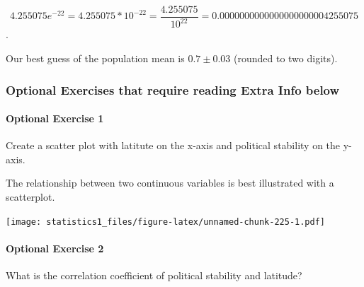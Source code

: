 \documentclass[]{article}
\newenvironment{Shaded}{\begin{snugshade}}{\end{snugshade}}
\newcommand{\KeywordTok}[1]{\textcolor[rgb]{0.13,0.29,0.53}{\textbf{#1}}}
\newcommand{\DataTypeTok}[1]{\textcolor[rgb]{0.13,0.29,0.53}{#1}}
\newcommand{\DecValTok}[1]{\textcolor[rgb]{0.00,0.00,0.81}{#1}}
\newcommand{\FloatTok}[1]{\textcolor[rgb]{0.00,0.00,0.81}{#1}}
\newcommand{\StringTok}[1]{\textcolor[rgb]{0.31,0.60,0.02}{#1}}
\newcommand{\OperatorTok}[1]{\textcolor[rgb]{0.81,0.36,0.00}{\textbf{#1}}}
\newcommand{\NormalTok}[1]{#1}
\let\oldparagraph\paragraph
\renewcommand{\paragraph}[1]{\oldparagraph{#1}\mbox{}}
\theoremstyle{definition}
\theoremstyle{definition}
\theoremstyle{definition}
\theoremstyle{remark}
\begin{document}
\[ 4.255075e^{-22} = 4.255075 * 10^{-22} = \frac{4.255075}{10^{22}} = 0.0000000000000000000004255075\].

Our best guess of the population mean is \(0.7 \pm 0.03\) (rounded to
two digits).

\subsubsection{Optional Exercises that require reading Extra Info
below}\label{optional-exercises-that-require-reading-extra-info-below-1}

\paragraph{Optional Exercise 1}\label{optional-exercise-1}

Create a scatter plot with latitute on the x-axis and political
stability on the y-axis.

The relationship between two continuous variables is best illustrated
with a scatterplot.

\begin{Shaded}
\end{Shaded}

\texttt{[image: statistics1\_files/figure-latex/unnamed-chunk-225-1.pdf]}

\paragraph{Optional Exercise 2}\label{optional-exercise-2}

What is the correlation coefficient of political stability and latitude?

\begin{Shaded}
\end{Shaded}
\end{document}
